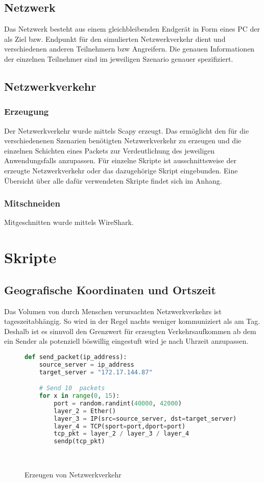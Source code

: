 \subsection{Netzwerk}
Das Netzwerk besteht aus einem gleichbleibenden Endgerät in Form eines PC der als Ziel bzw. Endpunkt für den simulierten Netzwerkverkehr dient und verschiedenen anderen Teilnehmern bzw Angreifern. Die genauen Informationen der einzelnen Teilnehmer sind im jeweiligen Szenario genauer spezifiziert.
\subsection{Netzwerkverkehr}
\subsubsection{Erzeugung}
Der Netzwerkverkehr wurde mittels Scapy erzeugt. Das ermöglicht den für die verschiedenenen Szenarien benötigten Netzwerkverkehr zu erzeugen und die einzelnen Schichten eines Packets zur Verdeutlichung des jeweiligen Anwendungsfalls anzupassen. Für einzelne Skripte ist ausschnittsweise der erzeugte Netzwerkverkehr oder das dazugehörige Skript eingebunden. Eine Übersicht über alle dafür verwendeten Skripte findet sich im Anhang.
\subsubsection{Mitschneiden}
Mitgeschnitten wurde mittels WireShark.

\section{Skripte}
\subsection{Geografische Koordinaten und Ortszeit}
Das Volumen von durch Menschen verursachten Netzwerkverkehrs ist tageszeitabhängig. So wird in der Regel nachts weniger kommuniziert als am Tag.  Deshalb ist es sinnvoll den Grenzwert für erzeugten Verkehrsaufkommen ab dem ein Sender als potenziell böswillig eingestuft wird je nach Uhrzeit anzupassen.\\
\begin{figure}[h!]

\begin{lstlisting}[language=python]
def send_packet(ip_address):
    source_server = ip_address
    target_server = "172.17.144.87"

    # Send 10  packets
    for x in range(0, 15):
        port = random.randint(40000, 42000)
        layer_2 = Ether()
        layer_3 = IP(src=source_server, dst=target_server)
        layer_4 = TCP(sport=port,dport=port)
        tcp_pkt = layer_2 / layer_3 / layer_4
        sendp(tcp_pkt)
\end{lstlisting}
\caption{Erzeugen von Netzwerkverkehr}\\
\end{figure}

